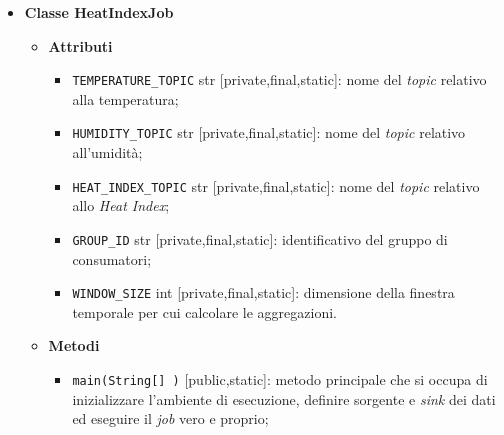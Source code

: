 \begin{itemize}
	\item \textbf{Classe HeatIndexJob}
	      \begin{itemize}
		      \item \textbf{Attributi}
		            \begin{itemize}
			            \item \texttt{TEMPERATURE\_TOPIC} str [private,final,static]: nome del \textit{topic} relativo alla temperatura;
			            \item \texttt{HUMIDITY\_TOPIC} str [private,final,static]: nome del \textit{topic} relativo all'umidità;
			            \item \texttt{HEAT\_INDEX\_TOPIC} str [private,final,static]: nome del \textit{topic} relativo allo \textit{Heat Index};
			            \item \texttt{GROUP\_ID} str [private,final,static]: identificativo del gruppo di consumatori;
			            \item \texttt{WINDOW\_SIZE} int [private,final,static]: dimensione della finestra temporale per cui calcolare le aggregazioni.
		            \end{itemize}
		      \item \textbf{Metodi}
		            \begin{itemize}
			            \item \texttt{main(String[] )} [public,static]: metodo principale che si occupa di inizializzare l'ambiente di esecuzione, definire sorgente e \textit{sink} dei dati ed eseguire il \textit{job} vero e proprio;


\end{itemize}
\end{itemize}
\end{itemize}
